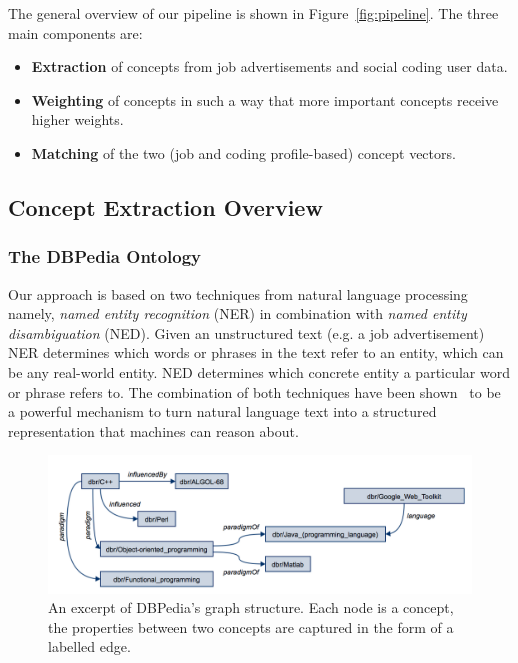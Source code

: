 \documentclass[conference]{IEEEtran}
\begin{document}
The general overview of our pipeline is shown in Figure~\ref{fig:pipeline}.
The three main components are:

\begin{itemize}

  \item \textbf{Extraction} of concepts from job advertisements and social
    coding user data.

  \item \textbf{Weighting} of concepts in such a way that more important
    concepts receive higher weights.

  \item \textbf{Matching} of the two (job and coding profile-based) concept
    vectors.

\end{itemize}

\subsection{Concept Extraction Overview}


\subsubsection{The DBPedia Ontology}
Our approach is based on two techniques from natural language processing namely,
\emph{named entity recognition} (NER) in combination with \emph{named entity
disambiguation} (NED). Given an unstructured text (e.g. a job advertisement) NER determines which words or phrases in the text refer to an
entity, which can be any real-world entity. NED
determines which concrete entity a particular word or phrase refers to.  The
combination of both techniques have been shown~\cite{aggarwal2012mining} to be a
powerful mechanism to turn natural language text into a structured representation
that machines can reason about.

\begin{figure}[!htb]
\centering
\includegraphics[scale=0.4]{../figs/dbpedia-example-graph.png}
\caption{An excerpt of DBPedia's graph structure. Each node is a concept, the properties between two concepts are captured in the form of a labelled edge.}
\label{fig:dbpedia-example}
\end{figure}
\end{document}
